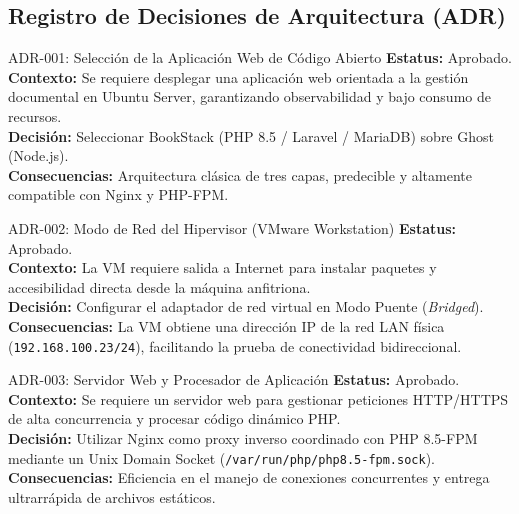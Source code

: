 \documentclass[12pt,a4paper]{article}
\begin{document}
\subsection{Registro de Decisiones de Arquitectura (ADR)}

\begin{adrbox}{ADR-001: Selección de la Aplicación Web de Código Abierto}
\textbf{Estatus:} Aprobado.\\
\textbf{Contexto:} Se requiere desplegar una aplicación web orientada a la gestión documental en Ubuntu Server, garantizando observabilidad y bajo consumo de recursos.\\
\textbf{Decisión:} Seleccionar BookStack (PHP 8.5 / Laravel / MariaDB) sobre Ghost (Node.js).\\
\textbf{Consecuencias:} Arquitectura clásica de tres capas, predecible y altamente compatible con Nginx y PHP-FPM.
\end{adrbox}

\vspace{0.2cm}

\begin{adrbox}{ADR-002: Modo de Red del Hipervisor (VMware Workstation)}
\textbf{Estatus:} Aprobado.\\
\textbf{Contexto:} La VM requiere salida a Internet para instalar paquetes y accesibilidad directa desde la máquina anfitriona.\\
\textbf{Decisión:} Configurar el adaptador de red virtual en Modo Puente (\textit{Bridged}).\\
\textbf{Consecuencias:} La VM obtiene una dirección IP de la red LAN física (\texttt{192.168.100.23/24}), facilitando la prueba de conectividad bidireccional.
\end{adrbox}

\vspace{0.2cm}

\begin{adrbox}{ADR-003: Servidor Web y Procesador de Aplicación}
\textbf{Estatus:} Aprobado.\\
\textbf{Contexto:} Se requiere un servidor web para gestionar peticiones HTTP/HTTPS de alta concurrencia y procesar código dinámico PHP.\\
\textbf{Decisión:} Utilizar Nginx como proxy inverso coordinado con PHP 8.5-FPM mediante un Unix Domain Socket (\texttt{/var/run/php/php8.5-fpm.sock}).\\
\textbf{Consecuencias:} Eficiencia en el manejo de conexiones concurrentes y entrega ultrarrápida de archivos estáticos.
\end{adrbox}
\end{document}
